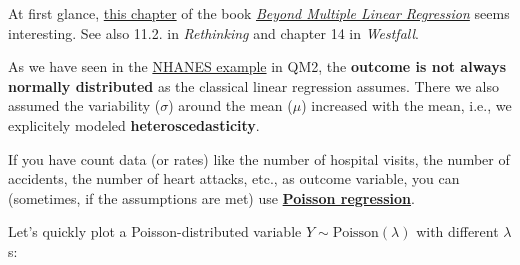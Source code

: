 \documentclass[
]{book}
\begin{document}
At first glance, \href{https://bookdown.org/roback/bookdown-BeyondMLR/ch-poissonreg.html}{this chapter}
of the book \href{https://bookdown.org/roback/bookdown-BeyondMLR/}{\emph{Beyond Multiple Linear Regression}} seems interesting.
See also 11.2. in \emph{Rethinking} and chapter 14 in \emph{Westfall}.

As we have seen in the \href{https://ec.europa.eu/info/funding-tenders/opportunities/portal/screen/opportunities/calls-for-proposals?isExactMatch=true&status=31094501,31094502,31094503&order=DESC&pageNumber=1&pageSize=50&sortBy=startDate}{NHANES example}
in QM2, the \textbf{outcome is not always normally distributed} as the classical linear regression
assumes. There we also assumed the variability (\(\sigma\)) around the mean (\(\mu\)) increased with the mean,
i.e., we explicitely modeled \textbf{heteroscedasticity}.

If you have count data (or rates) like the number of hospital visits,
the number of accidents, the number of heart attacks, etc., as outcome variable,
you can (sometimes, if the assumptions are met) use \href{https://en.wikipedia.org/wiki/Poisson_regression}{\textbf{Poisson regression}}.

Let's quickly plot a Poisson-distributed variable \(Y \sim \text{Poisson}(\lambda)\)
with different \(\lambda\)s:
\end{document}
